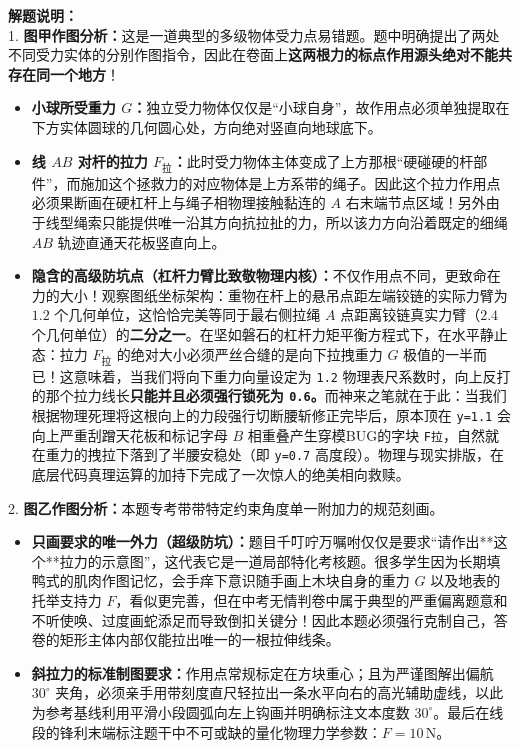 {\small\color{gray}
\textbf{解题说明：}\\
1. \textbf{图甲作图分析：}这是一道典型的多级物体受力点易错题。题中明确提出了两处不同受力实体的分别作图指令，因此在卷面上\textbf{这两根力的标点作用源头绝对不能共存在同一个地方}！
\begin{itemize}
    \item \textbf{小球所受重力 $G$：}独立受力物体仅仅是“小球自身”，故作用点必须单独提取在下方实体圆球的几何圆心处，方向绝对竖直向地球底下。
    \item \textbf{线 $AB$ 对杆的拉力 $F_{\text{拉}}$：}此时受力物体主体变成了上方那根“硬碰硬的杆部件”，而施加这个拯救力的对应物体是上方系带的绳子。因此这个拉力作用点必须果断画在硬杠杆上与绳子相物理接触黏连的 $A$ 右末端节点区域！另外由于线型绳索只能提供唯一沿其方向抗拉扯的力，所以该力方向沿着既定的细绳 $AB$ 轨迹直通天花板竖直向上。
    \item \textbf{隐含的高级防坑点（杠杆力臂比致敬物理内核）：}不仅作用点不同，更致命在力的大小！观察图纸坐标架构：重物在杆上的悬吊点距左端铰链的实际力臂为 $1.2$ 个几何单位，这恰恰完美等同于最右侧拉绳 $A$ 点距离铰链真实力臂（$2.4$ 个几何单位）的\textbf{二分之一}。在坚如磐石的杠杆力矩平衡方程式下，在水平静止态：拉力 $F_{\text{拉}}$ 的绝对大小必须严丝合缝的是向下拉拽重力 $G$ 极值的一半而已！这意味着，当我们将向下重力向量设定为 \texttt{1.2} 物理表尺系数时，向上反打的那个拉力线长\textbf{只能并且必须强行锁死为 \texttt{0.6}。}而神来之笔就在于此：当我们根据物理死理将这根向上的力段强行切断腰斩修正完毕后，原本顶在 \texttt{y=1.1} 会向上严重刮蹭天花板和标记字母 $B$ 相重叠产生穿模BUG的字块 \texttt{F拉}，自然就在重力的拽拉下落到了半腰安稳处（即 \texttt{y=0.7} 高度段）。物理与现实排版，在底层代码真理运算的加持下完成了一次惊人的绝美相向救赎。
\end{itemize}
2. \textbf{图乙作图分析：}本题专考带带特定约束角度单一附加力的规范刻画。
\begin{itemize}
    \item \textbf{只画要求的唯一外力（超级防坑）：}题目千叮咛万嘱咐仅仅是要求“请作出**这个**拉力的示意图”，这代表它是一道局部特化考核题。很多学生因为长期填鸭式的肌肉作图记忆，会手痒下意识随手画上木块自身的重力 $G$ 以及地表的托举支持力 $F$，看似更完善，但在中考无情判卷中属于典型的严重偏离题意和不听使唤、过度画蛇添足而导致倒扣关键分！因此本题必须强行克制自己，答卷的矩形主体内部仅能拉出唯一的一根拉伸线条。
    \item \textbf{斜拉力的标准制图要求：}作用点常规标定在方块重心；且为严谨图解出偏航 $30^{\circ}$ 夹角，必须亲手用带刻度直尺轻拉出一条水平向右的高光辅助虚线，以此为参考基线利用平滑小段圆弧向左上钩画并明确标注文本度数 $30^{\circ}$。最后在线段的锋利末端标注题干中不可或缺的量化物理力学参数：$F = 10\,\text{N}$。
\end{itemize}
}

